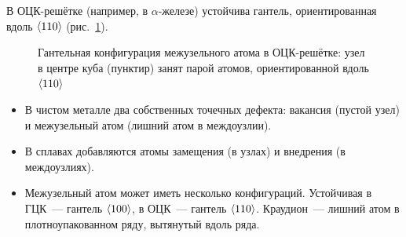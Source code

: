 В ОЦК-решётке (например, в $\alpha$-железе) устойчива гантель,
ориентированная вдоль $\langle 110\rangle$ (рис.~\ref{fig:int-bcc}).

\begin{figure}[ht]
\centering
{}
\caption{Гантельная конфигурация межузельного атома в ОЦК-решётке:
узел в центре куба (пунктир) занят парой атомов, ориентированной вдоль
$\langle 110\rangle$}
\label{fig:int-bcc}
\end{figure}

\begin{itogi}
\begin{itemize}
\item В чистом металле два собственных точечных дефекта: вакансия (пустой
узел) и межузельный атом (лишний атом в междоузлии).
\item В сплавах добавляются атомы замещения (в узлах) и внедрения
(в междоузлиях).
\item Межузельный атом может иметь несколько конфигураций. Устойчивая
в ГЦК~— гантель $\langle 100\rangle$, в ОЦК~— гантель $\langle 110\rangle$.
Краудион~— лишний атом в плотноупакованном ряду, вытянутый вдоль ряда.
\end{itemize}
\end{itogi}
